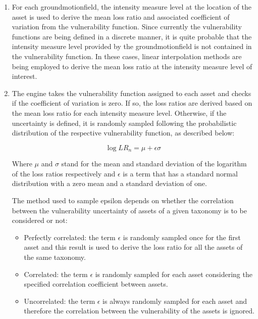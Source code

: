 \begin{enumerate}
\item For each \gls{groundmotionfield}, the intensity measure level at the location of the \gls{asset} is used to derive the mean loss ratio and associated coefficient of variation from the \gls{vulnerability function}. Since currently the \glspl{vulnerability function} are being defined in a discrete manner, it is quite probable that the intensity measure level provided by the \gls{groundmotionfield} is not contained in the \gls{vulnerability function}. In these cases, linear interpolation methods are being employed to derive the mean loss ratio at the intensity measure level of interest. 

\item The engine takes the \gls{vulnerability function} assigned to each \gls{asset} and checks if the coefficient of variation is zero. If so, the loss ratios are derived based on the mean loss ratio for each intensity measure level. Otherwise, if the uncertainty is defined, it is randomly sampled following the probabilistic distribution of the respective \gls{vulnerability function}, as described below:

\begin{equation}
\log{LR_n} = \mu + \epsilon\sigma
\end{equation}

Where $\mu$ and $\sigma$ stand for the mean and standard deviation of the logarithm of the loss ratios respectively and $\epsilon$ is a term that has a standard normal distribution with a zero mean and a standard deviation of one.  

The method used to sample epsilon depends on whether the correlation between the vulnerability uncertainty of \glspl{asset} of a given \gls{taxonomy} is to be considered or not:

\begin{itemize}

\item Perfectly correlated: the term $\epsilon$ is randomly sampled once for the first \gls{asset} and this result is used to derive the loss ratio for all the \glspl{asset} of the same \gls{taxonomy}. 

\item Correlated: the term $\epsilon$ is randomly sampled for each \gls{asset} considering the specified correlation coefficient between \glspl{asset}. 

\item Uncorrelated: the term $\epsilon$ is always randomly sampled for each \gls{asset} and therefore the correlation between the vulnerability of the \glspl{asset} is ignored.


\end{itemize}
\end{enumerate}
